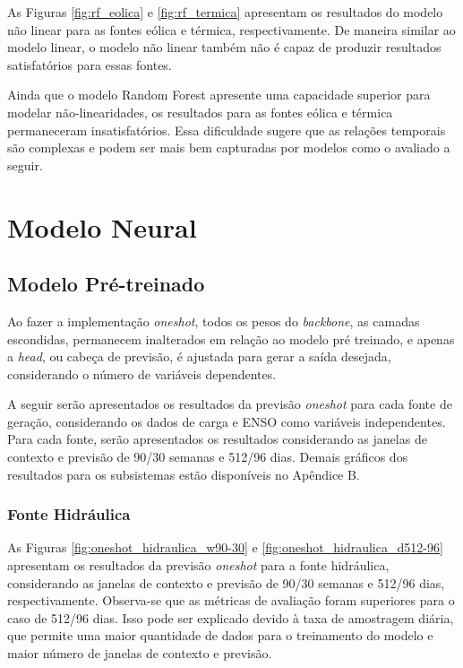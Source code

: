 As Figuras \ref{fig:rf_eolica} e \ref{fig:rf_termica} apresentam os resultados do modelo não linear para as fontes eólica 
e térmica, respectivamente. De maneira similar ao modelo linear, o modelo não linear também não é capaz de produzir resultados
satisfatórios para essas fontes.

Ainda que o modelo Random Forest apresente uma capacidade superior para modelar não-linearidades, os resultados para as 
fontes eólica e térmica permaneceram insatisfatórios. Essa dificuldade sugere que as relações temporais são complexas e 
podem ser mais bem capturadas por modelos como o avaliado a seguir.

\section{Modelo Neural}
\subsection{Modelo Pré-treinado}
Ao fazer a implementação \textit{oneshot}, todos os pesos do \textit{backbone}, as camadas escondidas, permanecem inalterados
em relação ao modelo pré treinado, e apenas a \textit{head}, ou cabeça de previsão, é ajustada para gerar a saída desejada,
considerando o número de variáveis dependentes.

A seguir serão apresentados os resultados da previsão \textit{oneshot} para cada fonte de geração, considerando os dados de carga e ENSO
como variáveis independentes. Para cada fonte, serão apresentados os resultados considerando as janelas de contexto e previsão
de 90/30 semanas e 512/96 dias. Demais gráficos dos resultados para os subsistemas estão disponíveis no Apêndice B.

\subsubsection{Fonte Hidráulica}
\begin{figure}[!ht]
  {}
  {}
\end{figure}
\begin{figure}[!ht]
  {}
  {}
\end{figure}
As Figuras \ref{fig:oneshot_hidraulica_w90-30} e \ref{fig:oneshot_hidraulica_d512-96} apresentam os resultados da previsão
\textit{oneshot} para a fonte hidráulica, considerando as janelas de contexto e previsão de 90/30 semanas e 512/96 dias, respectivamente.
Observa-se que as métricas de avaliação foram superiores para o caso de 512/96 dias. Isso pode ser explicado devido à
taxa de amostragem diária, que permite uma maior quantidade de dados para o treinamento do modelo e maior número de 
janelas de contexto e previsão.

